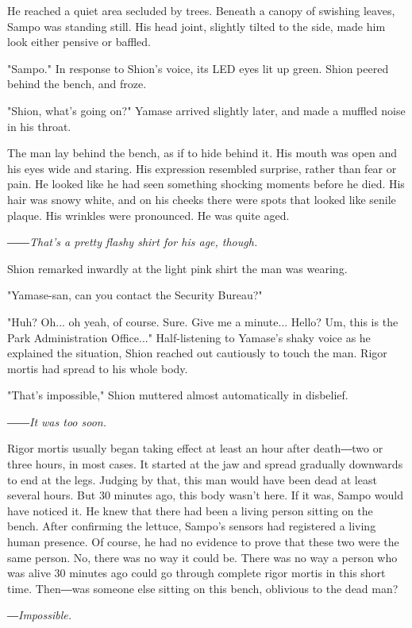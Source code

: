 He reached a quiet area secluded by trees. Beneath a canopy of swishing
leaves, Sampo was standing still. His head joint, slightly tilted to the
side, made him look either pensive or baffled.

"Sampo." In response to Shion's voice, its LED eyes lit up green. Shion
peered behind the bench, and froze.

"Shion, what's going on?" Yamase arrived slightly later, and made a
muffled noise in his throat.

The man lay behind the bench, as if to hide behind it. His mouth was
open and his eyes wide and staring. His expression resembled surprise,
rather than fear or pain. He looked like he had seen something shocking
moments before he died. His hair was snowy white, and on his cheeks
there were spots that looked like senile plaque. His wrinkles were
pronounced. He was quite aged.

\emph{――That's a pretty flashy shirt for his age, though.}

Shion remarked inwardly at the light pink shirt the man was wearing.

"Yamase-san, can you contact the Security Bureau?"

"Huh? Oh... oh yeah, of course. Sure. Give me a minute... Hello? Um,
this is the Park Administration Office..." Half-listening to Yamase's
shaky voice as he explained the situation, Shion reached out cautiously
to touch the man. Rigor mortis had spread to his whole body.

"That's impossible," Shion muttered almost automatically in disbelief.

\emph{――It was too soon.}

Rigor mortis usually began taking effect at least an hour after
death―two or three hours, in most cases. It started at the jaw and
spread gradually downwards to end at the legs. Judging by that, this man
would have been dead at least several hours. But 30 minutes ago, this
body wasn't here. If it was, Sampo would have noticed it. He knew that
there had been a living person sitting on the bench. After confirming
the lettuce, Sampo's sensors had registered a living human presence. Of
course, he had no evidence to prove that these two were the same person.
No, there was no way it could be. There was no way a person who was
alive 30 minutes ago could go through complete rigor mortis in this
short time. Then―was someone else sitting on this bench, oblivious to
the dead man?

\emph{―Impossible.}

